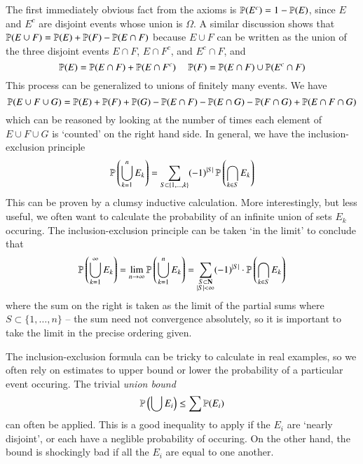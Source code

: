 The first immediately obvious fact from the axioms is $\mathbb{P}(E^c) = 1 - \mathbb{P}(E)$, since $E$ and $E^c$ are disjoint events whose union is $\Omega$. A similar discussion shows that $\mathbb{P}(E \cup F) = \mathbb{P}(E) + \mathbb{P}(F) - \mathbb{P}(E \cap F)$ because $E \cup F$ can be written as the union of the three disjoint events $E \cap F$, $E \cap F^c$, and $E^c \cap F$, and
%
\[ \mathbb{P}(E) = \mathbb{P}(E \cap F) + \mathbb{P}(E \cap F^c)\ \ \ \ \ \mathbb{P}(F) = \mathbb{P}(E \cap F) \cup \mathbb{P}(E^c \cap F) \]
%
This process can be generalized to unions of finitely many events. We have
%
\[ \mathbb{P}(E \cup F \cup G) = \mathbb{P}(E) + \mathbb{P}(F) + \mathbb{P}(G) - \mathbb{P}(E \cap F) - \mathbb{P}(E \cap G) - \mathbb{P}(F \cap G) + \mathbb{P}(E \cap F \cap G) \]
%
which can be reasoned by looking at the number of times each element of $E \cup F \cup G$ is `counted' on the right hand side. In general, we have the inclusion-exclusion principle
%
\[ \mathbb{P} \left( \bigcup_{k = 1}^n E_k \right) = \sum_{S \subset \{ 1, \dots, k \}} (-1)^{|S|} \operatorname{\mathbb{P}} \left( \bigcap_{k \in S} E_k \right) \]
%
This can be proven by a clumsy inductive calculation. More interestingly, but less useful, we often want to calculate the probability of an infinite union of sets $E_k$ occuring. The inclusion-exclusion principle can be taken `in the limit' to conclude that
%
\[ \mathbb{P} \left(\bigcup_{k = 1}^\infty E_k \right) = \lim_{n \to \infty} \mathbb{P} \left( \bigcup_{k = 1}^n E_k \right) = \sum_{\substack{S \subset \mathbf{N}\\|S| < \infty}} (-1)^{|S|} \cdot \mathbb{P} \left( \bigcap_{k \in S} E_k \right) \]
%
where the sum on the right is taken as the limit of the partial sums where $S \subset \{ 1, \dots, n \}$ -- the sum need not convergence absolutely, so it is important to take the limit in the precise ordering given.

The inclusion-exclusion formula can be tricky to calculate in real examples, so we often rely on estimates to upper bound or lower the probability of a particular event occuring. The trivial \emph{union bound}
%
\[ \mathbb{P} \left( \bigcup E_i \right) \leq \sum \mathbb{P}(E_i) \]
%
can often be applied. This is a good inequality to apply if the $E_i$ are `nearly disjoint', or each have a neglible probability of occuring. On the other hand, the bound is shockingly bad if all the $E_i$ are equal to one another.

